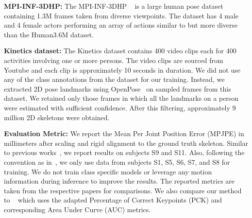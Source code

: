 \documentclass[10pt,twocolumn,letterpaper]{article}
\begin{document}
\noindent\textbf{MPI-INF-3DHP:} The MPI-INF-3DHP ~\cite{mono-3dhp2017} is a large human pose dataset containing 1.3M frames taken from diverse viewpoints. The dataset has 4 male and 4 female actors performing an array of actions similar to but more diverse than the Human3.6M dataset.

\noindent\textbf{Kinetics dataset:}
The Kinetics dataset contains 400 video clips each for 400 activities involving one or more persons. The video clips are sourced from Youtube and each clip is approximately 10 seconds in duration. We did not use any of the class annotations from the dataset for our training. Instead, we extracted 2D pose landmarks using OpenPose~\cite{OpenPose} on sampled frames from this dataset. We retained only those frames in which all the landmarks on a person were estimated with sufficient confidence. After this filtering, approximately 9 million 2D skeletons were obtained.

\noindent\textbf{Evaluation Metric:} We report the Mean Per Joint Position Error (MPJPE) in millimeters after scaling and rigid alignment to the ground truth skeleton. Similar to previous works~\cite{ZedNet_2018_ECCVW,Tung_2017_ICCV,li20143d,MartinezICCV2017,Rhodin_2018_ECCV,tekin2016direct,Zhou_2016_CVPR}, we report results on subjects S9 and S11. Also, following the convention as in~\cite{MartinezICCV2017,Rhodin_2018_ECCV}, we only use data from subjects S1, S5, S6, S7, and S8 for training. We do not train class specific models or leverage any motion information during inference to improve the results. The reported metrics are taken from the respective papers for comparisons. 
We also compare our method to ~\cite{mono-3dhp2017, zhou2017towards} which uses the adapted Percentage of Correct Keypoints (PCK) and corresponding Area Under Curve (AUC) metrics.
\end{document}
